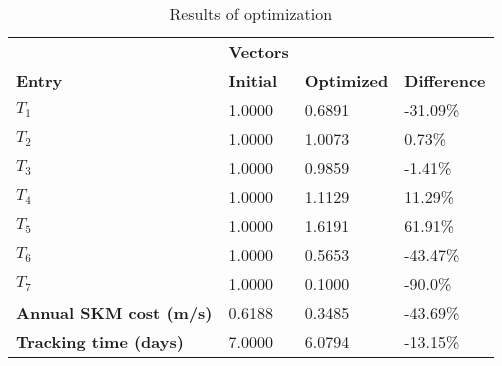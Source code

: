 \begin{table}[H]
\centering
\begin{tabular}{llll}
\textbf{}      & \cellcolor[HTML]{EFEFEF}\textbf{Vectors} & \textbf{} & \textbf{}         \\
\rowcolor[HTML]{EFEFEF} 
\textbf{Entry} & \textbf{Initial} & \textbf{Optimized} & \textbf{Difference} \\
$T_1$ & 1.0000 & 0.6891 & -31.09\% \\ 
$T_2$ & 1.0000 & 1.0073 & 0.73\% \\ 
$T_3$ & 1.0000 & 0.9859 & -1.41\% \\ 
$T_4$ & 1.0000 & 1.1129 & 11.29\% \\ 
$T_5$ & 1.0000 & 1.6191 & 61.91\% \\ 
$T_6$ & 1.0000 & 0.5653 & -43.47\% \\ 
$T_7$ & 1.0000 & 0.1000 & -90.0\% \\ 
\rowcolor[HTML]{EFEFEF} 
\textbf{Annual SKM cost (m/s)}  & 0.6188 & 0.3485 & -43.69\% \\ 
\rowcolor[HTML]{EFEFEF} 
\textbf{Tracking time (days)}  & 7.0000 & 6.0794 & -13.15\% \\ 
\end{tabular}
\caption{Results of optimization}
\label{tab:OptimizationAnalysis}
\end{table}
